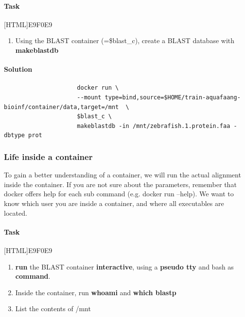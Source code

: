 \documentclass[12pt]{article}
\begin{document}
		

			\paragraph{Task}
				[HTML]{E9F0E9}{\parbox{\linewidth}{%
					\begin{enumerate}
						\item Using the BLAST container (=\$blast\_c), create a BLAST database with \textbf{makeblastdb} 						
					\end{enumerate}
				}}
			
			\paragraph{Solution}	
		
				\begin{minipage}{\linewidth}
					\begin{lstlisting}
					 docker run \
					 --mount type=bind,source=$HOME/train-aquafaang-bioinf/container/data,target=/mnt  \
					 $blast_c \
					 makeblastdb -in /mnt/zebrafish.1.protein.faa -dbtype prot
		 			\end{lstlisting}
				\end{minipage}
			
			\subsubsection{Life inside a container}
				To gain a better understanding of a container, we will run the actual alignment inside the container. 
				If you are not sure about the parameters, remember that docker offers help for each sub command (e.g. docker run --help).
				We want to know which user you are inside a container, and where all executables are located.
			
			
			
			\paragraph{Task}
				[HTML]{E9F0E9}{\parbox{\linewidth}{%
						\begin{enumerate}
							\item \textbf{run} the BLAST container \textbf{interactive}, using a \textbf{pseudo tty} and bash as \textbf{command}. 
							\item Inside the container, run \textbf{whoami} and \textbf{which blastp} 
							\item List the contents of /mnt
						\end{enumerate}
				}}
\end{document}
